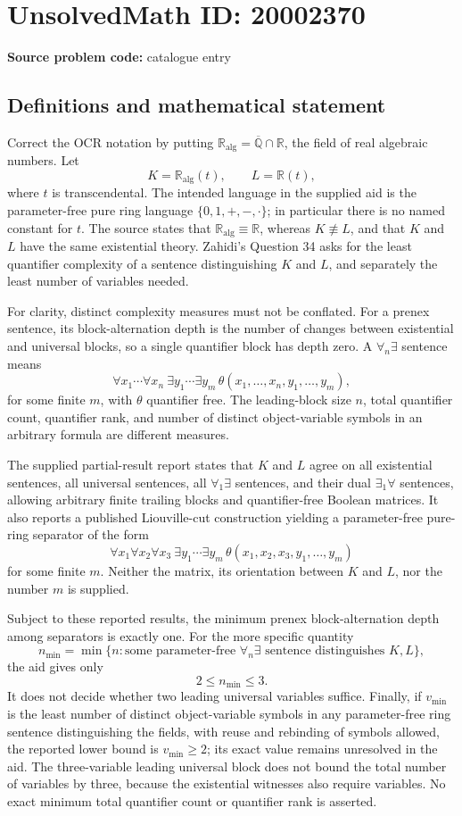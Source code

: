 \documentclass[11pt]{article}
\newcommand{\Q}{\mathbb{Q}}
\newcommand{\R}{\mathbb{R}}
\begin{document}
\section*{UnsolvedMath ID: 20002370}
\textbf{Source problem code:} catalogue entry
\subsection{Definitions and mathematical statement}
Correct the OCR notation by putting \(\R_{\mathrm{alg}}=\overline{\Q}\cap\R\), the field of real algebraic numbers. Let
\[
 K=\R_{\mathrm{alg}}(t),\qquad L=\R(t),
\]
where \(t\) is transcendental. The intended language in the supplied aid is the parameter-free pure ring language \(\{0,1,+,-,\cdot\}\); in particular there is no named constant for \(t\). The source states that \(\R_{\mathrm{alg}}\equiv\R\), whereas \(K\not\equiv L\), and that \(K\) and \(L\) have the same existential theory. Zahidi's Question 34 asks for the least quantifier complexity of a sentence distinguishing \(K\) and \(L\), and separately the least number of variables needed.

For clarity, distinct complexity measures must not be conflated. For a prenex sentence, its block-alternation depth is the number of changes between existential and universal blocks, so a single quantifier block has depth zero. A \(\forall_n\exists\) sentence means
\[
 \forall x_1\cdots\forall x_n\ \exists y_1\cdots\exists y_m\,
 \theta(x_1,\ldots,x_n,y_1,\ldots,y_m),
\]
for some finite \(m\), with \(\theta\) quantifier free. The leading-block size \(n\), total quantifier count, quantifier rank, and number of distinct object-variable symbols in an arbitrary formula are different measures.

The supplied partial-result report states that \(K\) and \(L\) agree on all existential sentences, all universal sentences, all \(\forall_1\exists\) sentences, and their dual \(\exists_1\forall\) sentences, allowing arbitrary finite trailing blocks and quantifier-free Boolean matrices. It also reports a published Liouville-cut construction yielding a parameter-free pure-ring separator of the form
\[
 \forall x_1\forall x_2\forall x_3\ \exists y_1\cdots\exists y_m\,
 \theta(x_1,x_2,x_3,y_1,\ldots,y_m)
\]
for some finite \(m\). Neither the matrix, its orientation between \(K\) and \(L\), nor the number \(m\) is supplied.

Subject to these reported results, the minimum prenex block-alternation depth among separators is exactly one. For the more specific quantity
\[
 n_{\min}=\min\{n:\text{some parameter-free }\forall_n\exists\text{ sentence distinguishes }K,L\},
\]
the aid gives only
\[
 2\le n_{\min}\le3.
\]
It does not decide whether two leading universal variables suffice. Finally, if \(v_{\min}\) is the least number of distinct object-variable symbols in any parameter-free ring sentence distinguishing the fields, with reuse and rebinding of symbols allowed, the reported lower bound is \(v_{\min}\ge2\); its exact value remains unresolved in the aid. The three-variable leading universal block does not bound the total number of variables by three, because the existential witnesses also require variables. No exact minimum total quantifier count or quantifier rank is asserted.
\end{document}
